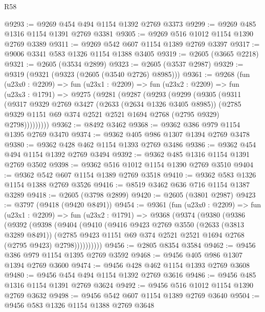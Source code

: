 \begin{lexlean}{R58}
\begin{coremodule}
@9293 := @9269 @454 @494 @1154 @1392 @2769 @3373
@9299 := @9269 @485 @1316 @1154 @1391 @2769 @3381
@9305 := @9269 @516 @1012 @1154 @1390 @2769 @3389
@9311 := @9269 @542 @607 @1154 @1389 @2769 @3397
@9317 := @9006 @3341 @583 @1326 @1154 @1388 @3405
@9319 := @2605 (@3665 @2218)
@9321 := @2605 (@3534 @2899)
@9323 := @2605 (@3537 @2987)
@9329 := @9319 (@9321 (@9323 (@2605 (@3540 @2726) @8985)))
@9361 := @9268
    (fun (u23x0 : @2209) =>
    fun (u23x1 : @2209) =>
    fun (u23x2 : @2209) =>
    fun (u23x3 : @1791) =>
    @9275
      (@9281
        (@9287
          (@9293
            (@9299
              (@9305
                (@9311
                  (@9317
                    @9329
                    @2769
                    @3427
                    (@2633 (@2634 @1326 @3405 @8985))
                    (@2785 @9329 @1151 @69 @374 @2521 @2521 @1694 @2768 (@2795 @9329) @2798)))))))))
@9362 := @8492 @3462
@9368 := @9362 @386 @979 @1154 @1395 @2769 @3470
@9374 := @9362 @405 @986 @1307 @1394 @2769 @3478
@9380 := @9362 @428 @462 @1154 @1393 @2769 @3486
@9386 := @9362 @454 @494 @1154 @1392 @2769 @3494
@9392 := @9362 @485 @1316 @1154 @1391 @2769 @3502
@9398 := @9362 @516 @1012 @1154 @1390 @2769 @3510
@9404 := @9362 @542 @607 @1154 @1389 @2769 @3518
@9410 := @9362 @583 @1326 @1154 @1388 @2769 @3526
@9416 := @8519 @3462 @636 @716 @1154 @1387 @3289
@9418 := @2605 (@3798 @2899)
@9420 := @2605 (@3801 @2987)
@9423 := @3797 (@9418 (@9420 @8491))
@9454 := @9361
    (fun (u23x0 : @2209) =>
    fun (u23x1 : @2209) =>
    fun (u23x2 : @1791) =>
    @9368
      (@9374
        (@9380
          (@9386
            (@9392
              (@9398
                (@9404
                  (@9410
                    (@9416
                      @9423
                      @2769
                      @3550
                      (@2633 (@3813 @3289 @8491))
                      (@2785
                        @9423
                        @1151
                        @69
                        @374
                        @2521
                        @2521
                        @1694
                        @2768
                        (@2795 @9423)
                        @2798))))))))))
@9456 := @2805 @8354 @3584
@9462 := @9456 @386 @979 @1154 @1395 @2769 @3592
@9468 := @9456 @405 @986 @1307 @1394 @2769 @3600
@9474 := @9456 @428 @462 @1154 @1393 @2769 @3608
@9480 := @9456 @454 @494 @1154 @1392 @2769 @3616
@9486 := @9456 @485 @1316 @1154 @1391 @2769 @3624
@9492 := @9456 @516 @1012 @1154 @1390 @2769 @3632
@9498 := @9456 @542 @607 @1154 @1389 @2769 @3640
@9504 := @9456 @583 @1326 @1154 @1388 @2769 @3648

\end{coremodule}
\end{lexlean}
